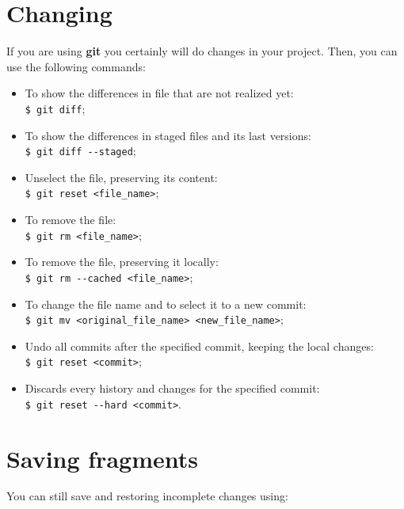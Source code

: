 \documentclass[12pt,a4paper,titlepage,brazil]{article}
\begin{document}
{%

\section{Changing}

If you are using {\bf git} you certainly will do changes in your project. Then, you can use the following commands:

\begin{itemize}
 \item To show the differences in file that are not realized yet:\\
   \texttt{\$ git diff};
 \item To show the differences in staged files and its last versions:\\
   \texttt{\$ git diff -\hspace{0.01cm}-staged};
 \item Unselect the file, preserving its content:\\
   \texttt{\$ git reset <file\_name>};
 \item To remove the file:\\
   \texttt{\$ git rm <file\_name>};
 \item To remove the file, preserving it locally:\\
   \texttt{\$ git rm -\hspace{0.01cm}-cached <file\_name>};
 \item To change the file name and to select it to a new commit:\\
   \texttt{\$ git mv <original\_file\_name> <new\_file\_name>};
 \item Undo all commits after the specified commit, keeping the local changes:\\
   \texttt{\$ git reset <commit>};   
 \item Discards every history and changes for the specified commit:\\
   \texttt{\$ git reset -\hspace{0.01cm}-hard <commit>}.   
\end{itemize}  


\section{Saving fragments}

You can still save and restoring incomplete changes using:

}
\end{document}
